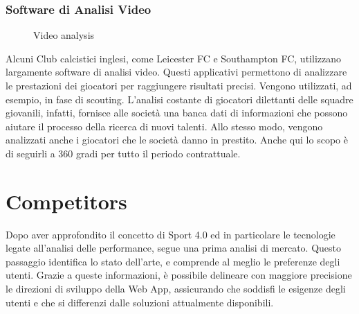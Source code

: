 \subsubsection{Software di Analisi Video}
\begin{figure}
    \centering
    \vspace{-10px}
    \caption{Video analysis}
    \label{fig:Video analysis}
\end{figure}

Alcuni Club calcistici inglesi, come Leicester FC e Southampton FC, utilizzano largamente software di analisi video. Questi applicativi permettono di analizzare le prestazioni dei giocatori per raggiungere risultati precisi. Vengono utilizzati, ad esempio, in fase di scouting. L'analisi costante di giocatori dilettanti delle squadre giovanili, infatti, fornisce alle società una banca dati di informazioni che possono aiutare il processo della ricerca di nuovi talenti. Allo stesso modo, vengono analizzati anche i giocatori che le società danno in prestito. Anche qui lo scopo è di seguirli a 360 gradi per tutto il periodo contrattuale.



\vspace{\baselineskip}
\section{Competitors}
\label{sec:competitor}

Dopo aver approfondito il concetto di Sport 4.0 ed in particolare le tecnologie legate all'analisi delle performance, segue una prima analisi di mercato. Questo passaggio identifica lo stato dell'arte, e comprende al meglio le preferenze degli utenti. Grazie a queste informazioni, è possibile delineare con maggiore precisione le direzioni di sviluppo della Web App, assicurando che soddisfi le esigenze degli utenti e che si differenzi dalle soluzioni attualmente disponibili.

